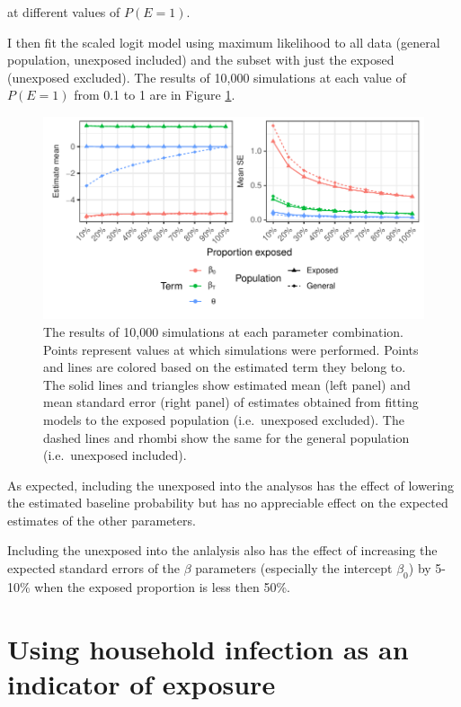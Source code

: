 \documentclass[
]{article}
\begin{document}
at different values of \(P(E=1)\).

I then fit the scaled logit model using maximum likelihood to all data (general population, unexposed included) and the subset with just the exposed (unexposed excluded). The results of 10,000 simulations at each value of \(P(E=1)\) from 0.1 to 1 are in Figure \ref{fig:plot2}.



\begin{figure}

{\centering \includegraphics{sim-plot/plot2} 

}

\caption{The results of 10,000 simulations at each parameter combination. Points represent values at which simulations were performed. Points and lines are colored based on the estimated term they belong to. The solid lines and triangles show estimated mean (left panel) and mean standard error (right panel) of estimates obtained from fitting models to the exposed population (i.e.~unexposed excluded). The dashed lines and rhombi show the same for the general population (i.e.~unexposed included).}\label{fig:plot2}
\end{figure}

As expected, including the unexposed into the analysos has the effect of lowering the estimated baseline probability but has no appreciable effect on the expected estimates of the other parameters.

Including the unexposed into the anlalysis also has the effect of increasing the expected standard errors of the \(\beta\) parameters (especially the intercept \(\beta_0\)) by 5-10\% when the exposed proportion is less then 50\%.

\hypertarget{using-household-infection-as-an-indicator-of-exposure}{%
\section{Using household infection as an indicator of exposure}\label{using-household-infection-as-an-indicator-of-exposure}}
\end{document}
